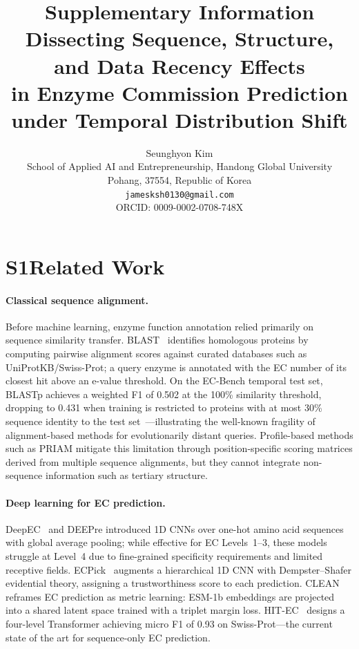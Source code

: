 \documentclass[11pt,a4paper]{article}
\title{\textbf{Supplementary Information}\\[4pt]
\large Dissecting Sequence, Structure, and Data Recency Effects\\
in Enzyme Commission Prediction under Temporal Distribution Shift}
\author{Seunghyon Kim\\
School of Applied AI and Entrepreneurship, Handong Global University\\
Pohang, 37554, Republic of Korea\\
\texttt{jamesksh0130@gmail.com}\\
ORCID: 0009-0002-0708-748X}
\date{}
\begin{document}
\maketitle
\linenumbers
\tableofcontents
\newpage

\section*{S1\quad Related Work}

\paragraph{Classical sequence alignment.}
Before machine learning, enzyme function annotation relied primarily on
sequence similarity transfer.
BLAST~\citep{altschul1990} identifies homologous proteins by computing pairwise
alignment scores against curated databases such as UniProtKB/Swiss-Prot;
a query enzyme is annotated with the EC number of its closest hit above an
e-value threshold.
On the EC-Bench temporal test set, BLASTp achieves a weighted F1 of 0.502 at
the 100\% similarity threshold, dropping to 0.431 when training is restricted
to proteins with at most 30\% sequence identity to the test
set~\citep{davoudi2026}---illustrating the well-known fragility of
alignment-based methods for evolutionarily distant queries.
Profile-based methods such as PRIAM mitigate this limitation through
position-specific scoring matrices derived from multiple sequence alignments,
but they cannot integrate non-sequence information such as tertiary structure.

\paragraph{Deep learning for EC prediction.}
DeepEC~\citep{ryu2019} and DEEPre introduced 1D CNNs over one-hot amino acid
sequences with global average pooling; while effective for EC Levels~1--3,
these models struggle at Level~4 due to fine-grained specificity requirements
and limited receptive fields.
ECPick~\citep{han2024} augments a hierarchical 1D CNN with Dempster--Shafer
evidential theory, assigning a trustworthiness score to each prediction.
CLEAN~\citep{yu2023} reframes EC prediction as metric learning: ESM-1b embeddings
are projected into a shared latent space trained with a triplet margin loss.
HIT-EC~\citep{dumontet2026} designs a four-level Transformer achieving micro F1 of
0.93 on Swiss-Prot---the current state of the art for sequence-only EC prediction.
\end{document}
